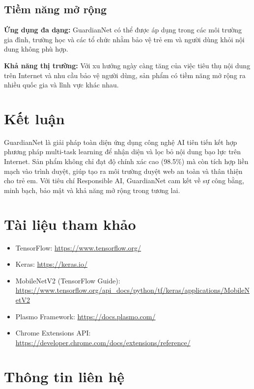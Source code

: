 \documentclass[12pt,a4paper]{article}
\begin{document}
\subsection{Tiềm năng mở rộng}

\textbf{Ứng dụng đa dạng:} GuardianNet có thể được áp dụng trong các môi trường gia đình, trường học và các tổ chức nhằm bảo vệ trẻ em và người dùng khỏi nội dung không phù hợp.

\textbf{Khả năng thị trường:} Với xu hướng ngày càng tăng của việc tiêu thụ nội dung trên Internet và nhu cầu bảo vệ người dùng, sản phẩm có tiềm năng mở rộng ra nhiều quốc gia và lĩnh vực khác nhau.

\section{Kết luận}

GuardianNet là giải pháp toàn diện ứng dụng công nghệ AI tiên tiến kết hợp phương pháp multi-task learning để nhận diện và lọc bỏ nội dung bạo lực trên Internet. Sản phẩm không chỉ đạt độ chính xác cao (98.5\%) mà còn tích hợp liền mạch vào trình duyệt, giúp tạo ra môi trường duyệt web an toàn và thân thiện cho trẻ em. Với tiêu chí Responsible AI, GuardianNet cam kết về sự công bằng, minh bạch, bảo mật và khả năng mở rộng trong tương lai.

\section*{Tài liệu tham khảo}
\begin{itemize}
  \item TensorFlow: \url{https://www.tensorflow.org/}
  \item Keras: \url{https://keras.io/}
  \item MobileNetV2 (TensorFlow Guide): \url{https://www.tensorflow.org/api_docs/python/tf/keras/applications/MobileNetV2}
  \item Plasmo Framework: \url{https://docs.plasmo.com/}
  \item Chrome Extensions API: \url{https://developer.chrome.com/docs/extensions/reference/}
\end{itemize}


\section{Thông tin liên hệ}
\end{document}
